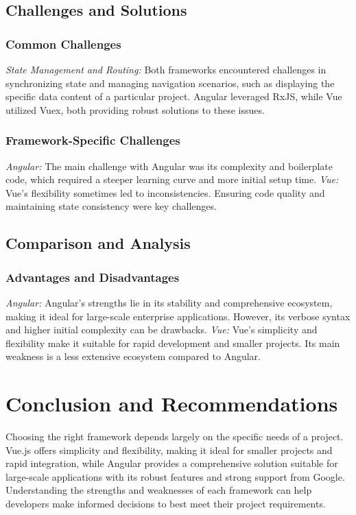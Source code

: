 \documentclass[conference]{IEEEtran}
\begin{document}
\subsection{Challenges and Solutions}
\subsubsection{Common Challenges}
\textit{State Management and Routing:} Both frameworks encountered challenges in synchronizing state and managing navigation scenarios, such as displaying the specific data content of a particular project. Angular leveraged RxJS, while Vue utilized Vuex, both providing robust solutions to these issues.
\subsubsection{Framework-Specific Challenges}
\textit{Angular: }The main challenge with Angular was its complexity and boilerplate code, which required a steeper learning curve and more initial setup time.
\newline\textit{Vue: }Vue's flexibility sometimes led to inconsistencies. Ensuring code quality and maintaining state consistency were key challenges.

\subsection{Comparison and Analysis}
\subsubsection{Advantages and Disadvantages}
\textit{Angular: }Angular's strengths lie in its stability and comprehensive ecosystem, making it ideal for large-scale enterprise applications. However, its verbose syntax and higher initial complexity can be drawbacks.
\newline\textit{Vue: }Vue's simplicity and flexibility make it suitable for rapid development and smaller projects. Its main weakness is a less extensive ecosystem compared to Angular.

\section{Conclusion and Recommendations}
Choosing the right framework depends largely on the specific needs of a project. Vue.js offers simplicity and flexibility, making it ideal for smaller projects and rapid integration, while Angular provides a comprehensive solution suitable for large-scale applications with its robust features and strong support from Google. Understanding the strengths and weaknesses of each framework can help developers make informed decisions to best meet their project requirements.
\end{document}
